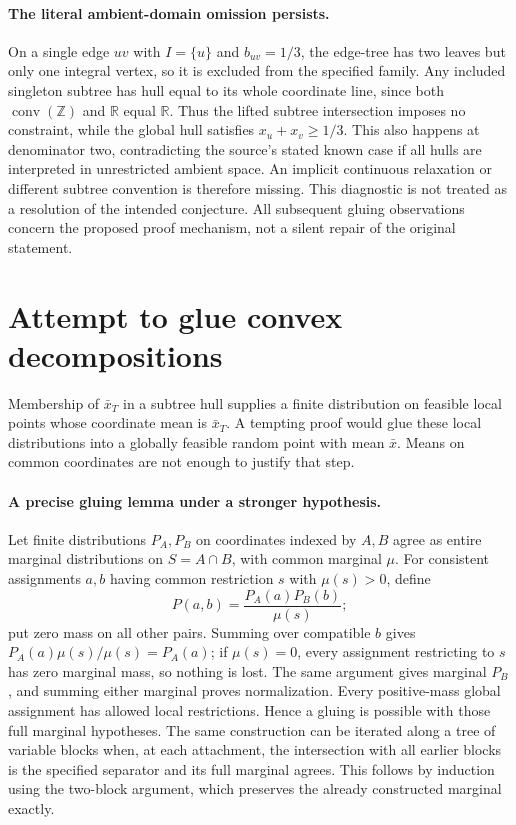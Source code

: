 \documentclass[11pt]{article}
\begin{document}
\paragraph{The literal ambient-domain omission persists.}
On a single edge $uv$ with $I=\{u\}$ and $b_{uv}=1/3$, the edge-tree
has two leaves but only one integral vertex, so it is excluded from the
specified family. Any included singleton subtree has hull equal to its
whole coordinate line, since both $\operatorname{conv}(\mathbb Z)$ and
$\mathbb R$ equal $\mathbb R$. Thus the lifted subtree intersection imposes
no constraint, while the global hull satisfies $x_u+x_v\ge1/3$.
This also happens at denominator two, contradicting the source's stated
known case if all hulls are interpreted in unrestricted ambient space.
An implicit continuous relaxation or different subtree convention is therefore
missing. This diagnostic is not treated as a resolution of the intended
conjecture. All subsequent gluing observations concern the proposed proof
mechanism, not a silent repair of the original statement.

\section{Attempt to glue convex decompositions}
Membership of $\bar x_T$ in a subtree hull supplies a finite distribution
on feasible local points whose coordinate mean is $\bar x_T$. A tempting
proof would glue these local distributions into a globally feasible random
point with mean $\bar x$. Means on common coordinates are not enough to
justify that step.

\paragraph{A precise gluing lemma under a stronger hypothesis.}
Let finite distributions $P_A,P_B$ on coordinates indexed by $A,B$ agree
as entire marginal distributions on $S=A\cap B$, with common marginal
$\mu$. For consistent assignments $a,b$ having common restriction $s$
with $\mu(s)>0$, define
\[
P(a,b)=\frac{P_A(a)P_B(b)}{\mu(s)};
\]
put zero mass on all other pairs. Summing over compatible $b$ gives
$P_A(a)\mu(s)/\mu(s)=P_A(a)$; if $\mu(s)=0$, every assignment
restricting to $s$ has zero marginal mass, so nothing is lost.
The same argument gives marginal $P_B$, and summing either marginal proves
normalization. Every positive-mass global assignment has allowed local
restrictions. Hence a gluing is possible with those full marginal hypotheses.
The same construction can be iterated along a tree of variable blocks when,
at each attachment, the intersection with all earlier blocks is the specified
separator and its full marginal agrees. This follows by induction using the
two-block argument, which preserves the already constructed marginal exactly.
\end{document}

